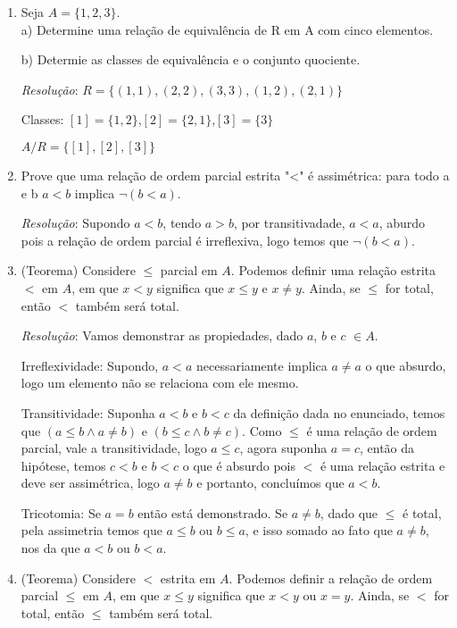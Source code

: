 \begin{enumerate}
    \item Seja $A = \{1,2,3\}$.\\
    
    a) Determine uma relação de equivalência de R em A com cinco elementos.
    
    b) Determie as classes de equivalência e o conjunto quociente.
    
    \textit{Resolução}: $R = \{(1,1),(2,2),(3,3),(1,2),(2,1)\}$
    
    Classes: $[1] = \{1,2\}$,$[2] = \{2,1\}$,$[3] = \{3\}$
    
    $A/R=\{[1],[2],[3]\}$
    
    \item Prove que uma relação de ordem parcial estrita "<" é assimétrica: para todo a e b $a<b$ implica $\neg(b<a)$.
    
    \textit{Resolução}: Supondo $a<b$, tendo $a>b$, por transitivadade, $a<a$, aburdo pois a relação de ordem parcial é irreflexiva, logo temos que $\neg(b<a)$.
    
    \item (Teorema) Considere $\leq$ parcial em $A$. Podemos definir uma relação estrita $<$ em $A$, em que $x<y$ significa que $x\leq y$ e $x \neq y$. Ainda, se $\leq $ for total, então $<$ também será total.
    
    \textit{Resolução}: Vamos demonstrar as propiedades, dado $a$, $b$ e $c$ $\in A$.
    
    Irreflexividade: Supondo, $a<a$ necessariamente implica $a \neq a$ o que absurdo, logo um elemento não se relaciona com ele mesmo.
    
    Transitividade: Suponha $a<b$ e $b<c$ da definição dada no enunciado, temos que $(a\leq b \wedge a \neq b)$ e $(b\leq c \wedge b \neq c)$. Como $\leq$ é uma relação de ordem parcial, vale a transitividade, logo $a\leq c$, agora suponha $a=c$, então da hipótese, temos $c<b$ e $b<c$ o que é absurdo pois $<$ é uma relação estrita e deve ser assimétrica, logo $a\neq b$ e portanto, concluímos que $a<b$.
    
    Tricotomia: Se $a=b$ então está demonstrado. Se $a\neq b$, dado que $\leq$ é total, pela assimetria temos que $a\leq b$ ou $b \leq a$, e isso somado ao fato que $a\neq b$, nos da que $a<b$ ou $b<a$.
    
    \item (Teorema) Considere $<$ estrita em $A$. Podemos definir a relação de ordem parcial $\leq $ em $A$, em que $x\leq y$ significa que $x < y$ ou $x = y$. Ainda, se $<$ for total, então $\leq$ também será total.
    

\end{enumerate}
